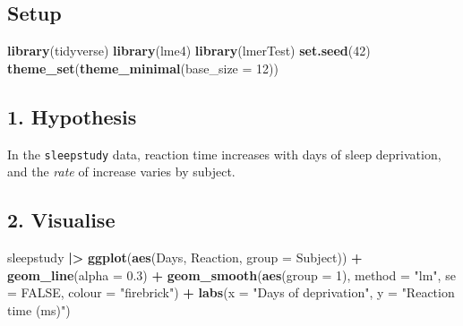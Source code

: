 \documentclass[
]{article}
\newenvironment{Shaded}{\begin{snugshade}}{\end{snugshade}}
\newcommand{\AttributeTok}[1]{\textcolor[rgb]{0.13,0.29,0.53}{#1}}
\newcommand{\ConstantTok}[1]{\textcolor[rgb]{0.56,0.35,0.01}{#1}}
\newcommand{\DecValTok}[1]{\textcolor[rgb]{0.00,0.00,0.81}{#1}}
\newcommand{\FloatTok}[1]{\textcolor[rgb]{0.00,0.00,0.81}{#1}}
\newcommand{\FunctionTok}[1]{\textcolor[rgb]{0.13,0.29,0.53}{\textbf{#1}}}
\newcommand{\NormalTok}[1]{#1}
\newcommand{\SpecialCharTok}[1]{\textcolor[rgb]{0.81,0.36,0.00}{\textbf{#1}}}
\newcommand{\StringTok}[1]{\textcolor[rgb]{0.31,0.60,0.02}{#1}}
\begin{document}
\subsection{Setup}\label{setup}

\begin{Shaded}
\begin{Highlighting}[]
\FunctionTok{library}\NormalTok{(tidyverse)}
\FunctionTok{library}\NormalTok{(lme4)}
\FunctionTok{library}\NormalTok{(lmerTest)}
\FunctionTok{set.seed}\NormalTok{(}\DecValTok{42}\NormalTok{)}
\FunctionTok{theme\_set}\NormalTok{(}\FunctionTok{theme\_minimal}\NormalTok{(}\AttributeTok{base\_size =} \DecValTok{12}\NormalTok{))}
\end{Highlighting}
\end{Shaded}

\subsection{1. Hypothesis}\label{hypothesis}

In the \texttt{sleepstudy} data, reaction time increases with days of
sleep deprivation, and the \emph{rate} of increase varies by subject.

\subsection{2. Visualise}\label{visualise}

\begin{Shaded}
\begin{Highlighting}[]

\NormalTok{sleepstudy }\SpecialCharTok{|\textgreater{}}
  \FunctionTok{ggplot}\NormalTok{(}\FunctionTok{aes}\NormalTok{(Days, Reaction, }\AttributeTok{group =}\NormalTok{ Subject)) }\SpecialCharTok{+}
  \FunctionTok{geom\_line}\NormalTok{(}\AttributeTok{alpha =} \FloatTok{0.3}\NormalTok{) }\SpecialCharTok{+}
  \FunctionTok{geom\_smooth}\NormalTok{(}\FunctionTok{aes}\NormalTok{(}\AttributeTok{group =} \DecValTok{1}\NormalTok{), }\AttributeTok{method =} \StringTok{"lm"}\NormalTok{, }\AttributeTok{se =} \ConstantTok{FALSE}\NormalTok{,}
              \AttributeTok{colour =} \StringTok{"firebrick"}\NormalTok{) }\SpecialCharTok{+}
  \FunctionTok{labs}\NormalTok{(}\AttributeTok{x =} \StringTok{"Days of deprivation"}\NormalTok{, }\AttributeTok{y =} \StringTok{"Reaction time (ms)"}\NormalTok{)}
\end{Highlighting}
\end{Shaded}
\end{document}
